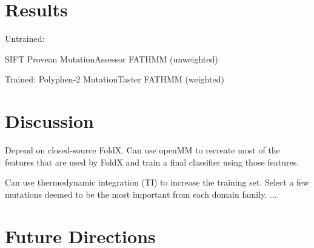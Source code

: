 \documentclass[11pt]{article}
\begin{document}
\section{Results}

Untrained:

SIFT
Provean 
MutationAssessor
FATHMM (unweighted)


Trained:
Polyphen-2
MutationTaster
FATHMM (weighted)



\section{Discussion}

Depend on closed-source FoldX. Can use openMM to recreate most of the features that are used by FoldX and train a final classifier using those features.

Can use thermodynamic integration (TI) to increase the training set. Select a few mutations deemed to be the most important from each domain family. ...


\section{Future Directions}









\printbibliography[title={References}]
\end{document}
